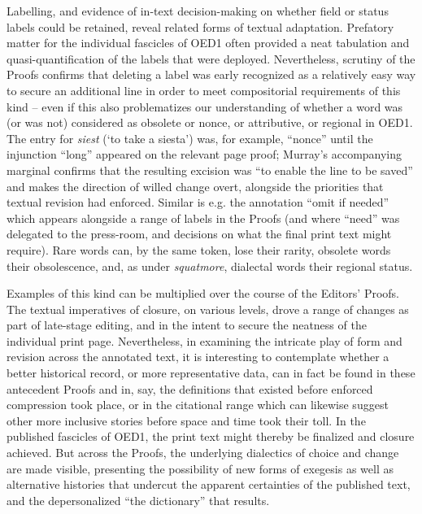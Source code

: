 \documentclass[output=paper,colorlinks,citecolor=brown,arabicfont,chinesefont]{langscibook}
\begin{document}
Labelling, and evidence of in-text decision-making on whether field or status labels could be retained, reveal related forms of textual adaptation. Prefatory matter for the individual fascicles of OED1 often provided a neat tabulation and quasi-quantification of the labels that were deployed. Nevertheless, scrutiny of the Proofs confirms that deleting a label was early recognized as a relatively easy way to secure an additional line in order to meet compositorial requirements of this kind – even if this also problematizes our understanding of whether a word was (or was not) considered as obsolete or nonce, or attributive, or regional in OED1. The entry for \emph{siest} (‘to take a siesta’) was, for example, “nonce” until the injunction “long” appeared on the relevant page proof; Murray’s accompanying marginal confirms that the resulting excision was “to enable the line to be saved” and makes the direction of willed change overt, alongside the priorities that textual revision had enforced. Similar is e.g. the annotation “omit if needed” which appears alongside a range of labels in the Proofs (and where “need” was delegated to the press-room, and decisions on what the final print text might require). Rare words can, by the same token, lose their rarity, obsolete words their obsolescence, and, as under \emph{squatmore}, dialectal words their regional status. 

Examples of this kind can be multiplied  over the course of the Editors’ Proofs.  The textual imperatives of closure, on various levels, drove a range of changes as part of late-stage editing, and in the intent to secure the neatness of the individual print page. Nevertheless, in examining the intricate play of form and revision across the annotated text, it is interesting to contemplate whether a better historical record, or more representative data, can in fact be found in these antecedent Proofs and in, say, the definitions that existed before enforced compression took place, or in the citational range which can likewise suggest other more inclusive stories before space and time took their toll. In the published fascicles of OED1, the print text might thereby be finalized and closure achieved. But across the Proofs, the underlying dialectics of choice and change are made visible, presenting the possibility of new forms of exegesis as well as alternative histories that undercut the apparent certainties of the published text, and the depersonalized “the dictionary” that results.

\end{document}
